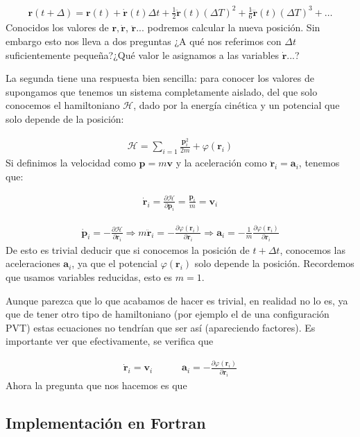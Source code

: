 \documentclass[11pt]{article} %
\newcommand{\parciales}[2]{\frac{\partial #1}{\partial #2}}
\newcommand{\tquad}{\quad \quad \quad}
\newcommand{\Hcal}{\mathcal{H}}
\newcommand{\an}{\mathbf{a}}
\newcommand{\pn}{\mathbf{p}}
\newcommand{\rn}{\mathbf{r}}
\newcommand{\vn}{\mathbf{v}}
\begin{document}
\begin{eqnarray}
	\rn(t+\Delta) = \rn (t) + \dot{\rn} (t) \Delta t + \frac{1}{2} \ddot{\rn} (t) (\Delta T)^2 + \frac{1}{6} \dddot{\rn} (t) (\Delta T)^3 + \ldots
\end{eqnarray}
Conocidos los valores de $\rn,\dot{\rn}$, $\ddot{\rn}...$ podremos calcular la nueva posición. Sin embargo esto nos lleva a dos preguntas ¿A qué nos referimos con $\Delta t$ suficientemente pequeña?¿Qué valor le asignamos a las variables $\dot{\rn}...$? 


La segunda tiene una respuesta bien sencilla: para conocer los valores de  supongamos que tenemos un sistema completamente aislado, del que solo conocemos el hamiltoniano $\Hcal$, dado por la energía cinética y un potencial que solo depende de la posición:

\begin{eqnarray}
	\Hcal = \sum_{i=1} \frac{\pn_i^2}{2m} + \varphi (\rn_i)
\end{eqnarray}
Si definimos la velocidad como $\pn=m\vn$ y la aceleración como $\ddot{\rn}_i = \an_i$, tenemos que:

\begin{eqnarray}
	\dot{\rn}_i = \parciales{\Hcal}{\pn_i} = \frac{\pn_i}{m} = \vn_i
\end{eqnarray}

\begin{eqnarray}
	\dot{\pn}_i = - \parciales{\Hcal}{\rn_i} \Rightarrow  m \ddot{\rn}_i = - \parciales{\varphi(\rn_i)}{\rn_i} \Rightarrow \an_i =  - \frac{1}{m} \parciales{\varphi(\rn_i)}{\rn_i}
\end{eqnarray}
De esto es trivial deducir que si conocemos la posición de $t+\Delta t$, conocemos las aceleraciones $\an_i$, ya que el potencial $\varphi(\rn_i)$ solo depende la posición. Recordemos que usamos variables reducidas, esto es $m=1$.

Aunque parezca que lo que acabamos de hacer es trivial, en realidad no lo es, ya que de tener otro tipo de hamiltoniano (por ejemplo el de una configuración PVT) estas ecuaciones no tendrían que ser así (apareciendo factores). Es importante ver que efectivamente, se verifica que 

\begin{eqnarray}
	\dot{\rn}_i = \vn_i \tquad \an_i = - \parciales{\varphi(\rn_i)}{\rn_i}
\end{eqnarray}
Ahora la pregunta que nos hacemos es que 


\subsection{Implementación en Fortran}
\end{document}
